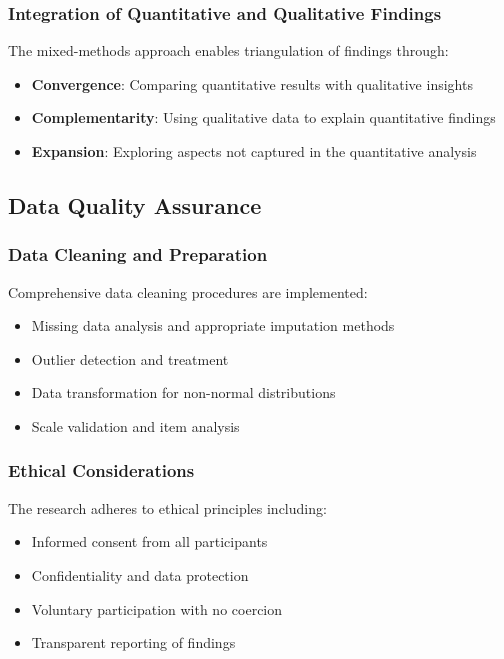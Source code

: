 \documentclass[../Main.tex]{subfiles}%
\begin{document}
	\subsubsection{Integration of Quantitative and Qualitative Findings}
	The mixed-methods approach enables triangulation of findings through:
	\begin{itemize}
		\item \textbf{Convergence}: Comparing quantitative results with qualitative insights
		\item \textbf{Complementarity}: Using qualitative data to explain quantitative findings
		\item \textbf{Expansion}: Exploring aspects not captured in the quantitative analysis
	\end{itemize}
	
	\subsection{Data Quality Assurance}
	
	\subsubsection{Data Cleaning and Preparation}
	Comprehensive data cleaning procedures are implemented:
	\begin{itemize}
		\item Missing data analysis and appropriate imputation methods
		\item Outlier detection and treatment
		\item Data transformation for non-normal distributions
		\item Scale validation and item analysis
	\end{itemize}
	
	\subsubsection{Ethical Considerations}
	The research adheres to ethical principles including:
	\begin{itemize}
		\item Informed consent from all participants
		\item Confidentiality and data protection
		\item Voluntary participation with no coercion
		\item Transparent reporting of findings
	\end{itemize}
	
\end{document}
